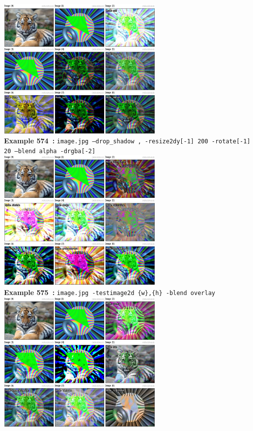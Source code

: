 \documentclass[a4paper,11pt,twoside]{book}
\begin{document}
\begin{center}\includegraphics[keepaspectratio=true,height=7cm,width=\textwidth]{img/gmic_def574.jpg}\\
{\footnotesize \textbf{Example 574~:} \texttt{image.jpg --drop\_shadow , -resize2dy[-1] 200 -rotate[-1] 20 --blend alpha -drgba[-2]}}
\\\includegraphics[keepaspectratio=true,height=7cm,width=\textwidth]{img/gmic_def575.jpg}\\
{\footnotesize \textbf{Example 575~:} \texttt{image.jpg -testimage2d \{w\},\{h\} -blend overlay}}
\\\includegraphics[keepaspectratio=true,height=7cm,width=\textwidth]{img/gmic_def576.jpg}\\

\end{center}
\end{document}
